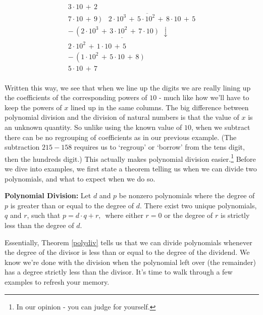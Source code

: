 \documentclass{ximera}
\begin{document}
\[
\begin{array}{r}
3 \cdot 10  \, +  \, 2 \\
7 \cdot 10  \, +  \, 9 \, \overline{)\quad 2\cdot 10^3  \, +  \, 5 \cdot 10^2  \, +  \, 8 \cdot 10  \, +  \, 5 } \\
- \,\underline{ \left( 2 \cdot 10^3 \right.  \, +  \,  3 \cdot 10^2   \, +  \, \left. 7 \cdot 10 \right)  \,   \,  \downarrow}  \\
2 \cdot 10^2  \, +   \, 1 \cdot 10  \, +  \, 5 \\ 
- \, \left( 1 \cdot 10^2 \right.  \, +   \,  5 \cdot 10  \,  +  \,\left.  8 \right) \\
5 \cdot 10   \, +  \, 7 \\
\end{array}
\]

Written this way, we see that when we line up the digits we are really lining up the coefficients of the corresponding powers of $10$ - much like how we'll have to keep the powers of $x$ lined up in the same columns.  The big difference between polynomial division and the division of natural numbers is that the value of $x$ is an unknown quantity.  So unlike using the known value of $10$, when we subtract there can be no regrouping of coefficients as in our previous example. (The subtraction $215 - 158$ requires us to `regroup' or `borrow' from the tens digit, then the hundreds digit.) This actually makes polynomial division easier.\footnote{In our opinion - you can judge for yourself.}  Before we dive into examples, we first state a theorem telling us when we can divide two polynomials, and what to expect when we do so.

 


\begin{theorem} \label{polydiv} \textbf{Polynomial Division:}  Let $d$ and $p$ be nonzero polynomials where the degree of $p$ is greater than or equal to the degree of $d$.  There exist two unique polynomials, $q$ and $r$, such that $p = d \cdot q + r,\,$ where either $r = 0$ or the degree of $r$ is strictly less than the degree of $d$.
\end{theorem}

 

Essentially, Theorem \ref{polydiv} tells us that we can divide polynomials whenever the degree of the divisor is less than or equal to the degree of the dividend.  We know we're done with the division when the polynomial left over (the remainder) has a degree strictly less than the divisor.  It's time to walk through a few examples to refresh your memory.
\end{document}
